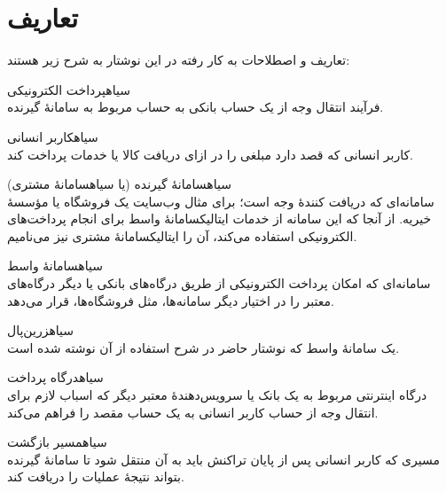 \section{تعاریف}
\label{بخش:تعاریف}
تعاریف و اصطلاحات به کار رفته در این نوشتار
به شرح زیر هستند:
\begin{itemize}
	
 ‌سیاه{پرداخت الکترونیکی}\\
فرآیند انتقال وجه از یک حساب بانکی به حساب
مربوط به سامانهٔ گیرنده.

 ‌سیاه{کاربر انسانی}\\
کاربر انسانی که قصد دارد مبلغی را در ازای
دریافت کالا یا خدمات پرداخت کند.

 ‌سیاه{سامانهٔ گیرنده} (یا ‌سیاه{سامانهٔ مشتری})\\
سامانه‌ای که دریافت کنندهٔ وجه است؛
برای مثال وب‌سایت یک فروشگاه یا مؤسسهٔ خیریه. 
از آنجا که این سامانه از خدمات
‌ایتالیک{سامانهٔ واسط} برای انجام
پرداخت‌های الکترونیکی استفاده می‌کند،
آن را ‌ایتالیک{سامانهٔ مشتری} نیز می‌نامیم.

 ‌سیاه{سامانهٔ واسط}\\
سامانه‌ای که امکان پرداخت الکترونیکی از طریق
درگاه‌های بانکی یا دیگر درگاه‌های معتبر را در
اختیار دیگر سامانه‌ها، مثل فروشگاه‌ها، قرار می‌دهد.

	\begin{itemize}	
		 ‌سیاه{زرین‌پال}\\
		یک سامانهٔ واسط که نوشتار حاضر
		در شرح استفاده از آن نوشته شده است.
	\end{itemize}

 ‌سیاه{درگاه پرداخت}\\
درگاه اینترنتی مربوط به یک بانک یا سرویس‌دهندهٔ
معتبر دیگر که اسباب لازم برای انتقال وجه از
حساب کاربر انسانی به یک حساب مقصد را فراهم می‌کند.

 ‌سیاه{مسیر بازگشت}\\
مسیری که کاربر انسانی پس از پایان تراکنش باید
به آن منتقل شود تا سامانهٔ گیرنده بتواند نتیجهٔ
عملیات را دریافت کند.

\end{itemize}
